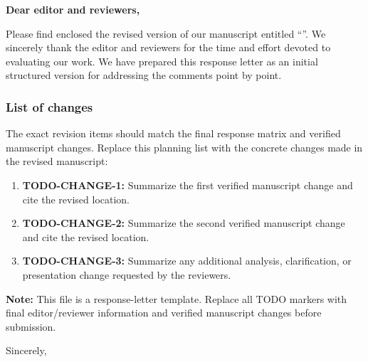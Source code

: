 \thispagestyle{empty}
\noindent \textbf{Dear editor and reviewers,}

Please find enclosed the revised version of our manuscript entitled \enquote{\thetitle}. We sincerely thank the editor and reviewers for the time and effort devoted to evaluating our work. We have prepared this response letter as an initial structured version for addressing the comments point by point.

\subsubsection*{List of changes}
The exact revision items should match the final response matrix and verified manuscript changes. Replace this planning list with the concrete changes made in the revised manuscript:

\begin{enumerate}
    \item \textbf{TODO-CHANGE-1:} Summarize the first verified manuscript change and cite the revised location.
    \item \textbf{TODO-CHANGE-2:} Summarize the second verified manuscript change and cite the revised location.
    \item \textbf{TODO-CHANGE-3:} Summarize any additional analysis, clarification, or presentation change requested by the reviewers.
\end{enumerate}

\textbf{Note:} This file is a response-letter template. Replace all TODO markers with final editor/reviewer information and verified manuscript changes before submission.

\vspace{8em}

\noindent Sincerely,

\noindent\theauthor

\vfill
